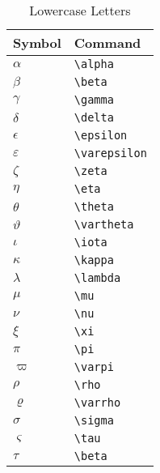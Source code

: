 \documentclass[10pt,a4paper]{article}
\begin{document}
\begin{table}[h]
\centering
\caption{Lowercase Letters} \label{table: Lowercase letters.}
\begin{tabular}{|l|l|}
\hline
Symbol & Command \\ 
\hline
$ \alpha $ & \lstinline[language={[LaTeX]TeX}]|\alpha| \\ 
\hline
$ \beta $ & \lstinline[language={[LaTeX]TeX}]|\beta| \\ 
\hline
$ \gamma $ & \lstinline[language={[LaTeX]TeX}]|\gamma| \\ 
\hline
$ \delta $ & \lstinline[language={[LaTeX]TeX}]|\delta| \\ 
\hline
$ \epsilon $ & \lstinline[language={[LaTeX]TeX}]|\epsilon| \\ 
\hline
$ \varepsilon $ & \lstinline[language={[LaTeX]TeX}]|\varepsilon| \\ 
\hline
$ \zeta $ & \lstinline[language={[LaTeX]TeX}]|\zeta| \\ 
\hline
$ \eta $ & \lstinline[language={[LaTeX]TeX}]|\eta| \\ 
\hline
$ \theta $ & \lstinline[language={[LaTeX]TeX}]|\theta| \\ 
\hline
$ \vartheta $ & \lstinline[language={[LaTeX]TeX}]|\vartheta| \\ 
\hline
$ \iota $ & \lstinline[language={[LaTeX]TeX}]|\iota| \\ 
\hline
$ \kappa $ & \lstinline[language={[LaTeX]TeX}]|\kappa| \\ 
\hline
$ \lambda $ & \lstinline[language={[LaTeX]TeX}]|\lambda| \\ 
\hline
$ \mu $ & \lstinline[language={[LaTeX]TeX}]|\mu| \\ 
\hline
$ \nu $ & \lstinline[language={[LaTeX]TeX}]|\nu| \\ 
\hline
$ \xi $ & \lstinline[language={[LaTeX]TeX}]|\xi| \\ 
\hline
$ \pi $ & \lstinline[language={[LaTeX]TeX}]|\pi| \\ 
\hline
$ \varpi $ & \lstinline[language={[LaTeX]TeX}]|\varpi| \\ 
\hline
$ \rho $ & \lstinline[language={[LaTeX]TeX}]|\rho| \\ 
\hline
$ \varrho $ & \lstinline[language={[LaTeX]TeX}]|\varrho| \\ 
\hline
$ \sigma $ & \lstinline[language={[LaTeX]TeX}]|\sigma| \\ 
\hline
$ \varsigma $ & \lstinline[language={[LaTeX]TeX}]|\tau| \\ 
\hline
$ \tau $ & \lstinline[language={[LaTeX]TeX}]|\beta| \\ 

\end{tabular}
\end{table}
\end{document}
